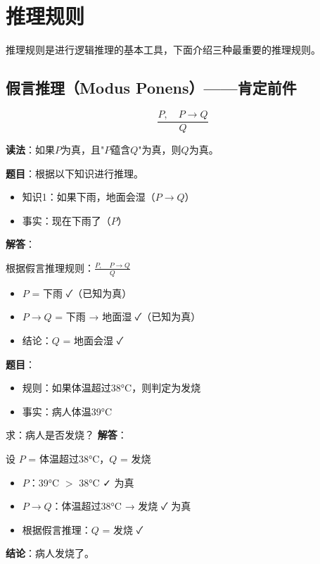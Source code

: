 \section{推理规则}

推理规则是进行逻辑推理的基本工具，下面介绍三种最重要的推理规则。

\subsection{假言推理（Modus Ponens）——肯定前件}
\begin{formulabox}
$$\frac{P, \quad P \to Q}{Q}$$

\textbf{读法}：如果$P$为真，且"$P$蕴含$Q$"为真，则$Q$为真。
\end{formulabox}

\begin{examplebox}[例题3.1 假言推理应用]
\textbf{题目}：根据以下知识进行推理。
\begin{itemize}[itemsep=0pt]
    \item 知识1：如果下雨，地面会湿（$P \to Q$）
    \item 事实：现在下雨了（$P$）
\end{itemize}
\tcblower
\textbf{解答}：

根据假言推理规则：$\frac{P, \quad P \to Q}{Q}$

\begin{itemize}[itemsep=0pt]
    \item $P$ = 下雨 ✓（已知为真）
    \item $P \to Q$ = 下雨 → 地面湿 ✓（已知为真）
    \item 结论：$Q$ = 地面会湿 ✓
\end{itemize}
\end{examplebox}

\begin{examplebox}
\textbf{题目}：
\begin{itemize}[itemsep=0pt]
    \item 规则：如果体温超过38°C，则判定为发烧
    \item 事实：病人体温39°C
\end{itemize}
求：病人是否发烧？
\tcblower
\textbf{解答}：

设 $P$ = 体温超过38°C，$Q$ = 发烧

\begin{itemize}[itemsep=0pt]
    \item $P$：39°C $>$ 38°C ✓ 为真
    \item $P \to Q$：体温超过38°C → 发烧 ✓ 为真
    \item 根据假言推理：$Q$ = 发烧 ✓
\end{itemize}

\textbf{结论}：病人发烧了。
\end{examplebox}


